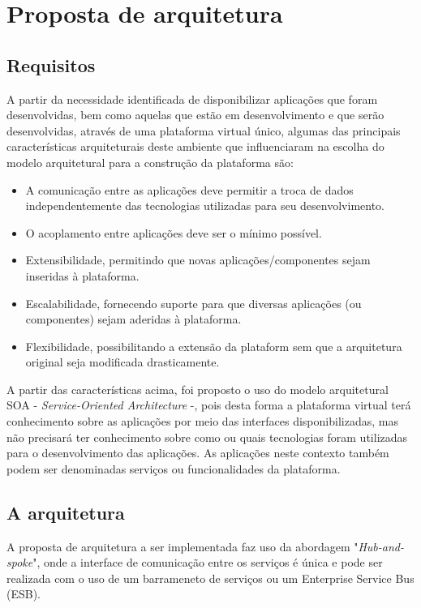 \section{Proposta de arquitetura}

\subsection{Requisitos}
A partir da necessidade identificada de disponibilizar aplicações que foram desenvolvidas, bem como aquelas que estão em desenvolvimento e que serão desenvolvidas, através de uma plataforma virtual único, algumas das principais características arquiteturais deste ambiente que influenciaram na escolha do modelo arquitetural para a construção da plataforma são:

\begin{itemize}
\item A comunicação entre as aplicações deve permitir a troca de dados independentemente das tecnologias utilizadas para seu desenvolvimento.
\item O acoplamento entre aplicações deve ser o mínimo possível.
\item Extensibilidade, permitindo que novas aplicações/componentes sejam inseridas à plataforma.
\item Escalabilidade, fornecendo suporte para que diversas aplicações (ou componentes) sejam aderidas à plataforma.
\item Flexibilidade,  possibilitando a extensão da plataform sem que a arquitetura original seja modificada drasticamente.
\end{itemize}

A partir das características acima, foi proposto o uso do modelo arquitetural SOA - \textit{Service-Oriented Architecture} -, pois desta forma a plataforma virtual terá conhecimento sobre as aplicações por meio das interfaces disponibilizadas, mas não precisará ter conhecimento sobre como ou quais tecnologias foram utilizadas para o desenvolvimento das aplicações. As aplicações neste contexto também podem ser denominadas serviços ou funcionalidades da plataforma.

\subsection{A arquitetura}

A proposta de arquitetura a ser implementada faz uso da abordagem "\textit{Hub-and-spoke}", onde a interface de comunicação entre os serviços é única e pode ser realizada com o uso de um barrameneto de serviços ou um Enterprise Service Bus (ESB).

